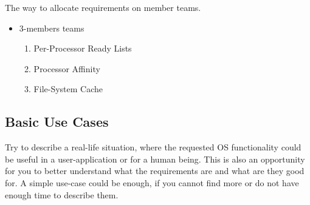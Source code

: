 % 
% 
% 
% 


The way to allocate requirements on member teams. 
\begin{itemize}
    \item 3-members teams
        \begin{enumerate}
            \item Per-Processor Ready Lists
            \item Processor Affinity
            \item File-System Cache
        \end{enumerate}
\end{itemize}





\subsection{Basic Use Cases}

Try to describe a real-life situation, where the requested OS functionality could be useful in a user-application or for a human being. This is also an opportunity for you to better understand what the requirements are and what are they good for. A simple use-case could be enough, if you cannot find more or do not have enough time to describe them.


